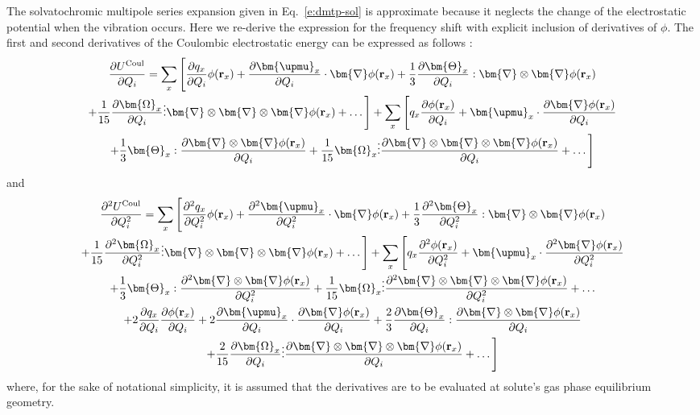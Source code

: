 \documentclass[a4paper,titlepage,twoside,fleqn,12pt]{book}
\newcommand{\BM}[1]{\bm{#1}}
\newcommand{\fderiv}[2]{\ensuremath{
    \frac{\partial #1}{\partial #2}}}
\newcommand{\sderiv}[2]{\ensuremath{
    \frac{\partial^2 #1}{\partial #2^2}
    }}
\begin{document}
\begin{refsection}
The solvatochromic multipole series expansion given in Eq.~\eqref{e:dmtp-sol}
is approximate because it neglects the change of the electrostatic
potential when the vibration occurs. Here we re\hyp{}derive the 
expression for the frequency shift with explicit inclusion of derivatives
of $\phi$. The first and second derivatives of the Coulombic
electrostatic energy can be expressed as follows \citep{Blasiak.Cho.JCP.2014}:
%
\begin{multline} \label{x:726439}
 \fderiv{U^{\rm Coul}}{Q_i} =
%
\sum_x 
\Bigg[ 
  \fderiv{q_x}{Q_i} \phi({\bf r}_x) + 
  \fderiv{{\BM \upmu}_x}{Q_i} \cdot {\BM \nabla} \phi({\bf r}_x) + \frac{1}{3}  
  \fderiv{{\BM \Theta}_x}{Q_i} : {\BM \nabla}\otimes{\BM \nabla} \phi({\bf r}_x) \\ + \frac{1}{15}   
  \fderiv{{\BM \Omega}_x}{Q_i} \vdots {\BM \nabla}\otimes{\BM \nabla}\otimes{\BM \nabla} \phi({\bf r}_x) + \ldots 
\Bigg] 
%
+
%
\sum_x 
\Bigg[ 
  q_x \fderiv{\phi({\bf r}_x)}{Q_i} + 
  {\BM \upmu}_x \cdot \fderiv{{\BM \nabla} \phi({\bf r}_x)}{Q_i} \\ + \frac{1}{3} 
  {\BM \Theta}_x : \fderiv{{\BM \nabla}\otimes{\BM \nabla} \phi({\bf r}_x)}{Q_i} + \frac{1}{15}
  {\BM \Omega}_x \vdots \fderiv{{\BM \nabla}\otimes{\BM \nabla}\otimes{\BM \nabla} \phi({\bf r}_x)}{Q_i} + \ldots 
\Bigg]
\end{multline}
%
and
%
\begin{multline} \label{x:726440}
 \sderiv{U^{\rm Coul}}{Q_i} =
%
\sum_x 
\Bigg[ 
  \sderiv{q_x}{Q_i} \phi({\bf r}_x) + 
  \sderiv{{\BM \upmu}_x}{Q_i} \cdot {\BM \nabla} \phi({\bf r}_x) + \frac{1}{3}  
  \sderiv{{\BM \Theta}_x}{Q_i} : {\BM \nabla}\otimes{\BM \nabla} \phi({\bf r}_x) \\ + \frac{1}{15}   
  \sderiv{{\BM \Omega}_x}{Q_i} \vdots {\BM \nabla}\otimes{\BM \nabla}\otimes{\BM \nabla} \phi({\bf r}_x) + \ldots 
\Bigg] 
%
+
%
\sum_x 
\Bigg[ 
  q_x \sderiv{\phi({\bf r}_x)}{Q_i} + 
  {\BM \upmu}_x \cdot \sderiv{{\BM \nabla} \phi({\bf r}_x)}{Q_i} \\ + \frac{1}{3} 
  {\BM \Theta}_x : \sderiv{{\BM \nabla}\otimes{\BM \nabla} \phi({\bf r}_x)}{Q_i} + \frac{1}{15}
  {\BM \Omega}_x \vdots \sderiv{{\BM \nabla}\otimes{\BM \nabla}\otimes{\BM \nabla} \phi({\bf r}_x)}{Q_i} + \ldots
\\
%
+2\fderiv{q_x}{Q_i} \fderiv{\phi({\bf r}_x)}{Q_i} 
+2\fderiv{{\BM \upmu}_x}{Q_i} \cdot \fderiv{{\BM \nabla} \phi({\bf r}_x)}{Q_i}
+ \frac{2}{3}  
  \fderiv{{\BM \Theta}_x}{Q_i} : \fderiv{{\BM \nabla}\otimes{\BM \nabla} \phi({\bf r}_x)}{Q_i} \\
+ \frac{2}{15}   
  \fderiv{{\BM \Omega}_x}{Q_i} \vdots \fderiv{{\BM \nabla}\otimes{\BM \nabla}\otimes{\BM \nabla} \phi({\bf r}_x)}{Q_i}
+ \ldots
\Bigg]
\end{multline}
%
where, for the sake of notational simplicity, 
it is assumed that the derivatives are to be evaluated at
solute's gas phase equilibrium geometry.


\end{refsection}
\end{document}
